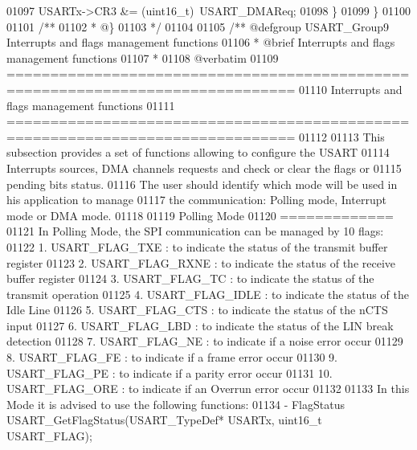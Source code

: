 \begin{DoxyCode}
01097     USARTx->CR3 &= (uint16\_t)~USART\_DMAReq;
01098   \}
01099 \}
01100 
01101 \textcolor{comment}{/**}
01102 \textcolor{comment}{  * @\}}
01103 \textcolor{comment}{  */}
01104 
01105 \textcolor{comment}{/** @defgroup USART\_Group9 Interrupts and flags management functions}
01106 \textcolor{comment}{ *  @brief   Interrupts and flags management functions }
01107 \textcolor{comment}{ *}
01108 \textcolor{comment}{@verbatim   }
01109 \textcolor{comment}{ ===============================================================================}
01110 \textcolor{comment}{                   Interrupts and flags management functions}
01111 \textcolor{comment}{ ===============================================================================  }
01112 \textcolor{comment}{}
01113 \textcolor{comment}{  This subsection provides a set of functions allowing to configure the USART }
01114 \textcolor{comment}{  Interrupts sources, DMA channels requests and check or clear the flags or }
01115 \textcolor{comment}{  pending bits status.}
01116 \textcolor{comment}{  The user should identify which mode will be used in his application to manage }
01117 \textcolor{comment}{  the communication: Polling mode, Interrupt mode or DMA mode. }
01118 \textcolor{comment}{    }
01119 \textcolor{comment}{  Polling Mode}
01120 \textcolor{comment}{  =============}
01121 \textcolor{comment}{  In Polling Mode, the SPI communication can be managed by 10 flags:}
01122 \textcolor{comment}{     1. USART\_FLAG\_TXE : to indicate the status of the transmit buffer register}
01123 \textcolor{comment}{     2. USART\_FLAG\_RXNE : to indicate the status of the receive buffer register}
01124 \textcolor{comment}{     3. USART\_FLAG\_TC : to indicate the status of the transmit operation}
01125 \textcolor{comment}{     4. USART\_FLAG\_IDLE : to indicate the status of the Idle Line             }
01126 \textcolor{comment}{     5. USART\_FLAG\_CTS : to indicate the status of the nCTS input}
01127 \textcolor{comment}{     6. USART\_FLAG\_LBD : to indicate the status of the LIN break detection}
01128 \textcolor{comment}{     7. USART\_FLAG\_NE : to indicate if a noise error occur}
01129 \textcolor{comment}{     8. USART\_FLAG\_FE : to indicate if a frame error occur}
01130 \textcolor{comment}{     9. USART\_FLAG\_PE : to indicate if a parity error occur}
01131 \textcolor{comment}{     10. USART\_FLAG\_ORE : to indicate if an Overrun error occur}
01132 \textcolor{comment}{}
01133 \textcolor{comment}{  In this Mode it is advised to use the following functions:}
01134 \textcolor{comment}{      - FlagStatus USART\_GetFlagStatus(USART\_TypeDef* USARTx, uint16\_t USART\_FLAG);}

\end{DoxyCode}
